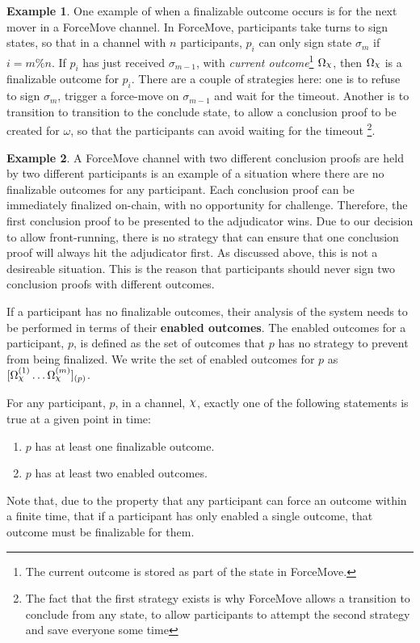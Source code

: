 \documentclass{article}
\DeclareRobustCommand{\rchi}{{\mathpalette\irchi\relax}}
\newcommand{\irchi}[2]{\raisebox{\depth}{$#1\chi$}} %
\theoremstyle{definition}
\newtheorem{example}{Example}[section]
\newcommand{\enf}[1]{[#1]}
\begin{document}
\begin{example}
One example of when a finalizable outcome occurs is for the next mover in a ForceMove channel.
In ForceMove, participants take turns to sign states, so that in a channel with $n$ participants,
$p_i$ can only sign state $\sigma_m$ if $i = m \% n$.
If $p_i$ has just received $\sigma_{m-1}$, with \textit{current outcome}\footnote{The current outcome is stored as part of the state in ForceMove.} $\Omega_\rchi$, then $\Omega_\rchi$
is a finalizable outcome for $p_i$.
There are a couple of strategies here: one is to refuse to sign $\sigma_m$, trigger a force-move
on $\sigma_{m-1}$ and wait for the timeout. 
Another is to transition to transition to the conclude state, to allow a conclusion proof
to be created for $\omega$, so that the participants can avoid waiting for the timeout
\footnote{The fact that the first strategy exists is why ForceMove allows a transition to
conclude from any state, to allow participants to attempt the second strategy and save everyone some time}.
\end{example}

\begin{example}
A ForceMove channel with two different conclusion proofs are held by two different participants
is an example of a situation where there are no finalizable outcomes for any participant.
Each conclusion proof can be immediately finalized on-chain, with no opportunity for challenge.
Therefore, the first conclusion proof to be presented to the adjudicator wins. 
Due to our decision to allow front-running, there is no strategy that can ensure that one
conclusion proof will always hit the adjudicator first.
As discussed above, this is not a desireable situation.
This is the reason that participants should never sign two conclusion proofs
with different outcomes.
\end{example}

If a participant has no finalizable outcomes, their analysis of the system needs to be performed
in terms of their \textbf{enabled outcomes}.
The enabled outcomes for a participant, $p$, is defined as the set of outcomes that $p$ has
no strategy to prevent from being finalized.
We write the set of enabled outcomes for $p$ as $\enf{\Omega_\rchi^{(1)} \dots \Omega_\rchi^{(m)}}_{(p)}$.

For any participant, $p$, in a channel, $\rchi$, exactly one of the following statements is
true at a given point in time:
\begin{enumerate}
  \item $p$ has at least one finalizable outcome.
  \item $p$ has at least two enabled outcomes.
\end{enumerate}
Note that, due to the property that any participant can force an outcome within a finite time,
that if a participant has only enabled a single outcome, that outcome must be finalizable for them.
\end{document}

